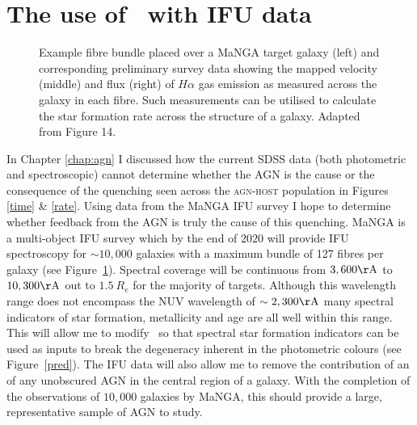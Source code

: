 \section{The use of \starpy\ with IFU data}\label{sec:IFU}

\begin{figure}
\caption[Example MaNGA fibre bundle on a target galaxy with example emission data]{Example fibre bundle placed over a MaNGA target galaxy (left) and corresponding preliminary survey data showing the mapped velocity (middle) and flux (right) of $H\alpha$ gas emission as measured across the galaxy in each fibre. Such measurements can be utilised to calculate the star formation rate across the structure of a galaxy. Adapted from \cite{bundy15} Figure 14.}
\label{fig:manga}
\end{figure}

In Chapter \ref{chap:agn} I discussed how the current SDSS data (both photometric and spectroscopic) cannot determine whether the AGN is the cause or the consequence of the quenching seen across the \textsc{agn-host} population in Figures \ref{time} \& \ref{rate}. Using data from the MaNGA IFU survey \citep{bundy15} I hope to determine whether feedback from the AGN is truly the cause of this quenching. MaNGA is a multi-object IFU survey which by the end of $2020$ will provide IFU spectroscopy for $\sim10,000$ galaxies with a maximum bundle of 127 fibres per galaxy (see Figure~\ref{fig:manga}). Spectral coverage will be continuous from $3,600\rm{\AA}$ to $10,300\rm{\AA}$ out to $1.5~R_e$ for the majority of targets. Although this wavelength range does not encompass the NUV wavelength of $\sim2,300\rm{\AA}$ many spectral indicators of star formation, metallicity and age are all well within this range. This will allow me to modify \starpy\ so that spectral star formation indicators \citep[such as $H\alpha$;][]{kennicutt94} can be used as inputs to break the degeneracy inherent in the photometric colours (see Figure~\ref{pred}). The IFU data will also allow me to remove the contribution of an of any unobscured AGN in the central region of a galaxy. With the completion of the observations of $10,000$ galaxies by MaNGA, this should provide a large, representative sample of AGN to study.

